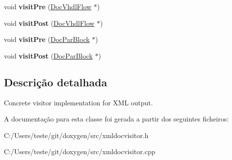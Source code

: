 \begin{DoxyCompactItemize}
\item 
\hypertarget{class_xml_doc_visitor_ab7c53055027c60e0a3a9f4f93e9c3d85}{void {\bfseries visit\-Pre} (\hyperlink{class_doc_vhdl_flow}{Doc\-Vhdl\-Flow} $\ast$)}\label{class_xml_doc_visitor_ab7c53055027c60e0a3a9f4f93e9c3d85}

\item 
\hypertarget{class_xml_doc_visitor_a79febe42f6e032c27aad9a418f979eca}{void {\bfseries visit\-Post} (\hyperlink{class_doc_vhdl_flow}{Doc\-Vhdl\-Flow} $\ast$)}\label{class_xml_doc_visitor_a79febe42f6e032c27aad9a418f979eca}

\item 
\hypertarget{class_xml_doc_visitor_acc4035c695184dd01a26145a88c1a588}{void {\bfseries visit\-Pre} (\hyperlink{class_doc_par_block}{Doc\-Par\-Block} $\ast$)}\label{class_xml_doc_visitor_acc4035c695184dd01a26145a88c1a588}

\item 
\hypertarget{class_xml_doc_visitor_a4bd3a84f45e2f6dc6420638ee8e4ee27}{void {\bfseries visit\-Post} (\hyperlink{class_doc_par_block}{Doc\-Par\-Block} $\ast$)}\label{class_xml_doc_visitor_a4bd3a84f45e2f6dc6420638ee8e4ee27}

\end{DoxyCompactItemize}


\subsection{Descrição detalhada}
Concrete visitor implementation for X\-M\-L output. 

A documentação para esta classe foi gerada a partir dos seguintes ficheiros\-:\begin{DoxyCompactItemize}
\item 
C\-:/\-Users/teste/git/doxygen/src/xmldocvisitor.\-h\item 
C\-:/\-Users/teste/git/doxygen/src/xmldocvisitor.\-cpp\end{DoxyCompactItemize}
